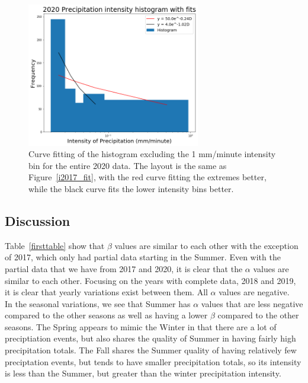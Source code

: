 \documentclass[11pt]{report}
\begin{document}
\begin{figure}[b]
  \centering
  \includegraphics[width=0.675\textwidth]{Figures/inten2020_fit.png}
  \caption[Fitting Intensity histogram for 2020 with different bins]
          {\label{i2020_fit} Curve fitting of the histogram excluding the 1
            mm/minute intensity bin for the entire 2020 data. The layout is
            the same as Figure~\ref{i2017_fit}, with the red curve fitting
            the extremes better, while the black curve fits the lower
            intensity bins better.  }
\end{figure}

\clearpage

\subsection{Discussion}\label{sec:apcd}


Table~\ref{firsttable} show that $\beta$ values are similar to each other
with the exception of 2017, which only had partial data starting in the
Summer. Even with the partial data that we have from 2017 and 2020, it is
clear that the $\alpha$ values are similar to each other. Focusing on the
years with complete data, 2018 and 2019, it is clear that yearly variations
exist between them. All $\alpha$ values are negative.\\[-1.5em]





In the seasonal variations, we see that Summer has $\alpha$ values that are
less negative compared to the other seasons as well as having a lower
$\beta$ compared to the other seasons.  The Spring appears to mimic the
Winter in that there are a lot of preciptiation events, but also shares the
quality of Summer in having fairly high precipitation totals. The Fall
shares the Summer quality of having relatively few preciptation events, but
tends to have smaller precipitation totals, so its intensity is less than
the Summer, but greater than the winter precipitation intensity.
\end{document}
